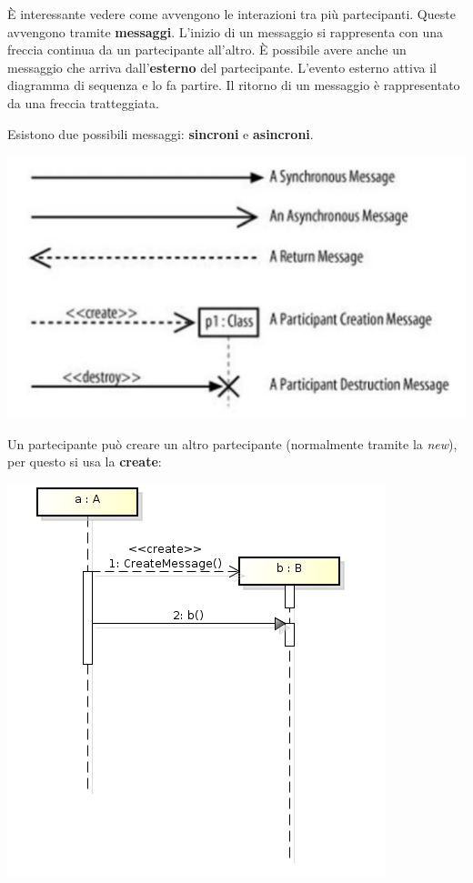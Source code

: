 È interessante vedere come avvengono le interazioni tra più partecipanti. Queste avvengono tramite \textbf{messaggi}. L'inizio di un messaggio si rappresenta con una freccia continua da un partecipante all'altro. È possibile avere anche un messaggio che arriva dall'\textbf{esterno} del partecipante. L'evento esterno attiva il diagramma di sequenza e lo fa partire. Il ritorno di un messaggio è rappresentato da una freccia tratteggiata.

Esistono due possibili messaggi: \textbf{sincroni} e \textbf{asincroni}.

\begin{center}
\includegraphics[width=0.75\columnwidth]{img5} %
\end{center}

Un partecipante può creare un altro partecipante (normalmente tramite la \textit{new}), per questo si usa la \textbf{create}:

\begin{center}
\includegraphics[width=0.75\columnwidth]{img7} %
\end{center}

